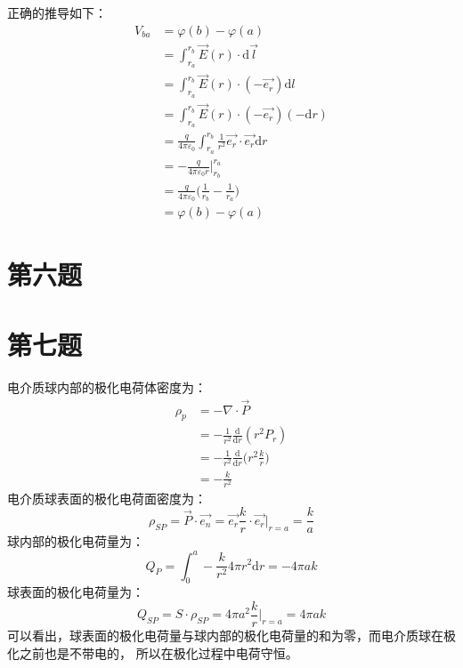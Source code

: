 \documentclass[a4paper]{article}
\begin{document}
		正确的推导如下：
		\begin{equation}
			\begin{split}
				V_{ba} &= \varphi(b) - \varphi(a)\\
				&= \int _{r_a} ^{r_b} \vec{E}(r)\cdot\mathrm{d}\vec{l}\\
				&= \int _{r_a} ^{r_b} \vec{E}(r)\cdot(-\vec{e_r})\mathrm{d}l\\
				&= \int _{r_a} ^{r_b} \vec{E}(r)\cdot(-\vec{e_r})(-\mathrm{d}r)\\
				&= \frac{q}{4\pi\varepsilon_0} \int _{r_a} ^{r_b} \frac{1}{r^2}\vec{e_r}\cdot\vec{e_r}\mathrm{d}r\\
				&= - \frac{q}{4\pi\varepsilon_0 r} \bigg| _{r_b} ^{r_a}\\
				&= \frac{q}{4\pi\varepsilon_0} \bigg(\frac{1}{r_b} - \frac{1}{r_a} \bigg)\\
				&= \varphi(b)-\varphi(a)
			\end{split}
		\end{equation}
	
	\section{第六题}

	\section{第七题}
		电介质球内部的极化电荷体密度为：
		\begin{equation}
			\begin{split}
				\rho_p &= - \nabla \cdot \vec{P}\\
				&= - \frac{1}{r^2} \frac{\mathrm{d}}{\mathrm{d}r}(r^2 P_r)\\
				&= - \frac{1}{r^2} \frac{\mathrm{d}}{\mathrm{d}r} \bigg( r^2 \frac{k}{r} \bigg)\\
				&= - \frac{k}{r^2}
			\end{split}
		\end{equation}
		电介质球表面的极化电荷面密度为：
		\begin{equation}
			\rho _{SP} = \vec{P} \cdot \vec{e_n} = \vec{e_r} \frac{k}{r} \cdot \vec{e_r}  \bigg | _{r=a} = \frac{k}{a}
		\end{equation}
		球内部的极化电荷量为：
		\begin{equation}
			Q_P = \int _0 ^a -\frac{k}{r^2} 4\pi r^2 \mathrm{d}r = -4\pi ak
		\end{equation}
		球表面的极化电荷量为：
		\begin{equation}
			Q_{SP} = S \cdot \rho _{SP} = 4\pi a^2 \frac{k}{r} \bigg| _{r=a} = 4\pi ak
		\end{equation}
		可以看出，球表面的极化电荷量与球内部的极化电荷量的和为零，而电介质球在极化之前也是不带电的，
		所以在极化过程中电荷守恒。
\end{document}
